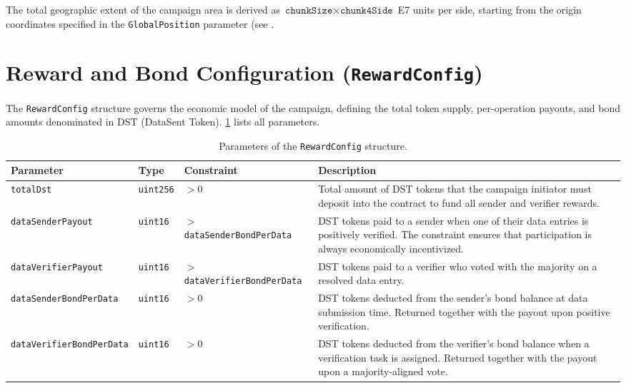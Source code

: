 The total geographic extent of the campaign area is derived as $\texttt{chunkSize} \times \texttt{chunk4Side}$ E7 units per side, starting from the origin coordinates specified in the \texttt{GlobalPosition} parameter (see .
\section{Reward and Bond Configuration (\texttt{RewardConfig})}\label{sec:appendix-a-rewards}

The \texttt{RewardConfig} structure governs the economic model of the campaign, defining the total token supply, per-operation payouts, and bond amounts denominated in DST (DataSent Token).
\ref{tab:params-rewards} lists all parameters.
\begin{table}
    \begin{tabular}{p{3.8cm} l p{2.8cm} p{4.8cm}}
        \hline
        \textbf{Parameter} & \textbf{Type} & \textbf{Constraint} & \textbf{Description} \\
        \hline
        \texttt{totalDst}
        & \texttt{uint256}
        & $> 0$
        & Total amount of DST tokens that the campaign initiator must deposit into the contract to fund all sender and verifier rewards. \\[6pt]

        \texttt{dataSenderPayout}
        & \texttt{uint16}
        & $>$ \texttt{dataSender\-BondPerData}
        & DST tokens paid to a sender when one of their data entries is positively verified.
        The constraint ensures that participation is always economically incentivized. \\[6pt]

        \texttt{dataVerifierPayout}
        & \texttt{uint16}
        & $>$ \texttt{dataVerifier\-BondPerData}
        & DST tokens paid to a verifier who voted with the majority on a resolved data entry. \\[6pt]

        \texttt{dataSenderBond\-PerData}
        & \texttt{uint16}
        & $> 0$
        & DST tokens deducted from the sender's bond balance at data submission time.
        Returned together with the payout upon positive verification. \\[6pt]

        \texttt{dataVerifierBond\-PerData}
        & \texttt{uint16}
        & $> 0$
        & DST tokens deducted from the verifier's bond balance when a verification task is assigned.
        Returned together with the payout upon a majority-aligned vote. \\
        \hline
    \end{tabular}
    \caption{Parameters of the \texttt{RewardConfig} structure.}
    \label{tab:params-rewards}
\end{table}

